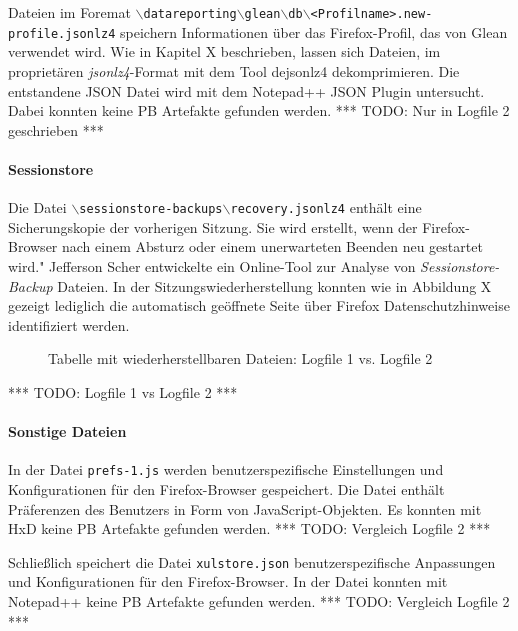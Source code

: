 Dateien im Foremat \texttt{$\backslash$datareporting$\backslash$glean$\backslash$db$\backslash$<Profilname>.new-profile.jsonlz4} speichern Informationen über das Firefox-Profil, das von Glean verwendet wird. Wie in Kapitel X beschrieben, lassen sich Dateien, im proprietären \textit{jsonlz4}-Format mit dem Tool dejsonlz4 dekomprimieren. Die entstandene JSON Datei wird mit dem Notepad++ JSON Plugin untersucht. Dabei konnten keine PB Artefakte gefunden werden.
*** TODO: Nur in Logfile 2 geschrieben ***

\paragraph*{Sessionstore}
Die Datei \texttt{$\backslash$sessionstore-backups$\backslash$recovery.jsonlz4} enthält eine Sicherungskopie der vorherigen Sitzung. Sie wird erstellt, wenn der Firefox-Browser nach einem Absturz oder einem unerwarteten Beenden neu gestartet wird." %
Jefferson Scher entwickelte ein Online-Tool zur Analyse von \textit{Sessionstore-Backup} Dateien.
In der Sitzungswiederherstellung konnten wie in Abbildung X gezeigt lediglich die automatisch geöffnete Seite über Firefox Datenschutzhinweise identifiziert werden.
\begin{figure}[h!]
	\caption{Tabelle mit wiederherstellbaren Dateien: Logfile 1 vs. Logfile 2}
\end{figure}
*** TODO: Logfile 1 vs Logfile 2 ***

\paragraph*{Sonstige Dateien}
In der Datei \texttt{prefs-1.js} werden benutzerspezifische Einstellungen und Konfigurationen für den Firefox-Browser gespeichert. Die Datei enthält Präferenzen des Benutzers in Form von JavaScript-Objekten. Es konnten mit HxD keine PB Artefakte gefunden werden.
*** TODO: Vergleich Logfile 2 ***

Schließlich speichert die Datei \texttt{xulstore.json} benutzerspezifische Anpassungen und Konfigurationen für den Firefox-Browser. In der Datei konnten mit Notepad++ keine PB Artefakte gefunden werden.
*** TODO: Vergleich Logfile 2 ***	

